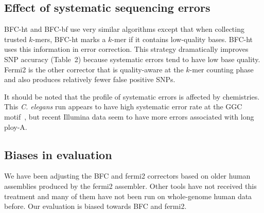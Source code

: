 \documentclass{bioinfo2}
\begin{document}
\subsection{Effect of systematic sequencing errors}
BFC-ht and BFC-bf use very similar algorithms except that when collecting
trusted $k$-mers, BFC-ht marks a $k$-mer if it contains low-quality bases. BFC-ht
uses this information in error correction. This strategy dramatically improves
SNP accuracy (Table~2) because systematic errors tend to have low base quality.
Fermi2 is the other corrector that is quality-aware at the $k$-mer counting
phase and also produces relatively fewer false positive SNPs.

It should be noted that the profile of systematic errors is affected by
chemistries. This {\it C. elegans} run appears to have high systematic error
rate at the GGC motif~\citep{Nakamura:2011aa}, but recent Illumina data seem
to have more errors associated with long ploy-A.

\subsection{Biases in evaluation}
We have been adjusting the BFC and fermi2 correctors based on older human
assemblies produced by the fermi2 assembler. Other tools have not received this
treatment and many of them have not been run on whole-genome human data before.
Our evaluation is biased towards BFC and fermi2.
\vspace{1cm}

\end{document}
